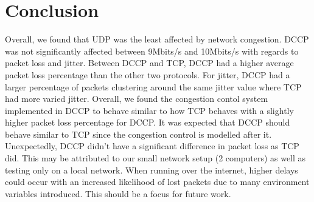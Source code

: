 \documentclass[letterpaper, 9 pt, balance, conference]{ieeeconf}
\begin{document}






\section{Conclusion}
\label{sec:concl}

Overall, we found that UDP was the least affected by network congestion.  DCCP was not 
significantly affected between 9Mbits/s and 10Mbits/s with regards to packet loss and 
jitter.  Between DCCP and TCP, DCCP had a higher average packet loss 
percentage than the other two protocols.  For jitter, DCCP had a larger percentage
of packets clustering around the same jitter value where TCP had more varied jitter. 
Overall, 
we found the congestion contol system implemented in DCCP to behave similar to how TCP 
behaves with a slightly higher packet loss percentage for DCCP. It was expected that 
DCCP should behave similar to TCP since the congestion control is modelled after it. 
Unexpectedly, DCCP didn't have a significant difference in packet loss as TCP did. 
This may be attributed to our small network setup (2 computers) as well as testing 
only on a local network.  When running over the internet, higher delays could 
occur with an increased likelihood of lost packets due to many environment variables 
introduced.  This should be a focus for future work.

\balance

\end{document}
